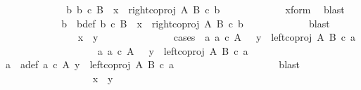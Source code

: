 \begin{isabellebody}
\ \ \ \ \ \ \ \ \ \isamarkupfalse%
\ \isamarkupfalse%
\ {\isachardoublequoteopen}{\isasymexists}\ b{\isachardot}{\kern0pt}\ b\ {\isasymin}\isactrlsub c\ B\ {\isasymand}\ x\ {\isacharequal}{\kern0pt}\ right{\isacharunderscore}{\kern0pt}coproj\ A\ B\ {\isasymcirc}\isactrlsub c\ b{\isachardoublequoteclose}\isanewline
\ \ \ \ \ \ \ \ \ \ \ \isamarkupfalse%
\ x{\isacharunderscore}{\kern0pt}form\ \isamarkupfalse%
\ blast\isanewline
\ \ \ \ \ \ \ \ \ \isamarkupfalse%
\ \isamarkupfalse%
\ b\ \ b{\isacharunderscore}{\kern0pt}def{\isacharcolon}{\kern0pt}\ {\isachardoublequoteopen}b\ {\isasymin}\isactrlsub c\ B\ {\isasymand}\ x\ {\isacharequal}{\kern0pt}\ right{\isacharunderscore}{\kern0pt}coproj\ A\ B\ {\isasymcirc}\isactrlsub c\ b{\isachardoublequoteclose}\isanewline
\ \ \ \ \ \ \ \ \ \ \ \isamarkupfalse%
\ blast\isanewline
\ \ \ \ \ \ \ \ \ \ \ \ \ \ \isamarkupfalse%
\ {\isachardoublequoteopen}x\ {\isacharequal}{\kern0pt}\ y{\isachardoublequoteclose}\isanewline
\ \ \ \ \ \ \ \ \ \ \ \ \ \ \isamarkupfalse%
{\isacharparenleft}{\kern0pt}cases\ {\isachardoublequoteopen}{\isasymexists}\ a{\isachardot}{\kern0pt}\ a\ {\isasymin}\isactrlsub c\ A\ \ {\isasymand}\ y\ {\isacharequal}{\kern0pt}\ left{\isacharunderscore}{\kern0pt}coproj\ A\ B\ {\isasymcirc}\isactrlsub c\ a{\isachardoublequoteclose}{\isacharparenright}{\kern0pt}\isanewline
\ \ \ \ \ \ \ \ \ \ \ \ \ \ \ \ \ \isamarkupfalse%
\ {\isachardoublequoteopen}{\isasymexists}\ a{\isachardot}{\kern0pt}\ a\ {\isasymin}\isactrlsub c\ A\ \ {\isasymand}\ y\ {\isacharequal}{\kern0pt}\ left{\isacharunderscore}{\kern0pt}coproj\ A\ B\ {\isasymcirc}\isactrlsub c\ a{\isachardoublequoteclose}\isanewline
\ \ \ \ \ \ \ \ \ \ \ \ \ \ \ \ \ \isamarkupfalse%
\ \isamarkupfalse%
\ a{\isacharprime}{\kern0pt}\ \ a{\isacharprime}{\kern0pt}{\isacharunderscore}{\kern0pt}def{\isacharcolon}{\kern0pt}\ {\isachardoublequoteopen}a{\isacharprime}{\kern0pt}\ {\isasymin}\isactrlsub c\ A{\isachardoublequoteclose}\ {\isachardoublequoteopen}y\ {\isacharequal}{\kern0pt}\ left{\isacharunderscore}{\kern0pt}coproj\ A\ B\ {\isasymcirc}\isactrlsub c\ a{\isacharprime}{\kern0pt}{\isachardoublequoteclose}\isanewline
\ \ \ \ \ \ \ \ \ \ \ \ \ \ \ \ \ \ \ \isamarkupfalse%
\ blast\isanewline
\ \ \ \ \ \ \ \ \ \ \ \ \ \ \ \ \ \isamarkupfalse%
\ {\isachardoublequoteopen}x\ {\isacharequal}{\kern0pt}\ y{\isachardoublequoteclose}\isanewline

\end{isabellebody}
